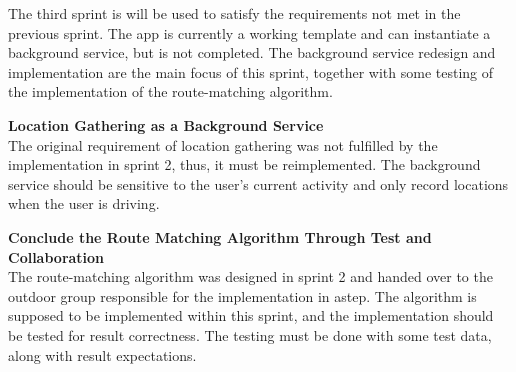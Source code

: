 The third sprint is will be used to satisfy the requirements not met in the previous sprint.
The app is currently a working template and can instantiate a background service, but is not completed. 
The background service redesign and implementation are the main focus of this sprint, together with some testing of the implementation of the route-matching algorithm.

\textbf{Location Gathering as a Background Service}\\
The original requirement of location gathering was not fulfilled by the implementation in sprint 2, thus, it must be reimplemented.
The background service should be sensitive to the user's current activity and only record locations when the user is driving.

\textbf{Conclude the Route Matching Algorithm Through Test and Collaboration}\\
The route-matching algorithm was designed in sprint 2 and handed over to the outdoor group responsible for the implementation in \gls{astep}.
The algorithm is supposed to be implemented within this sprint, and the implementation should be tested for result correctness.
The testing must be done with some test data, along with result expectations.
